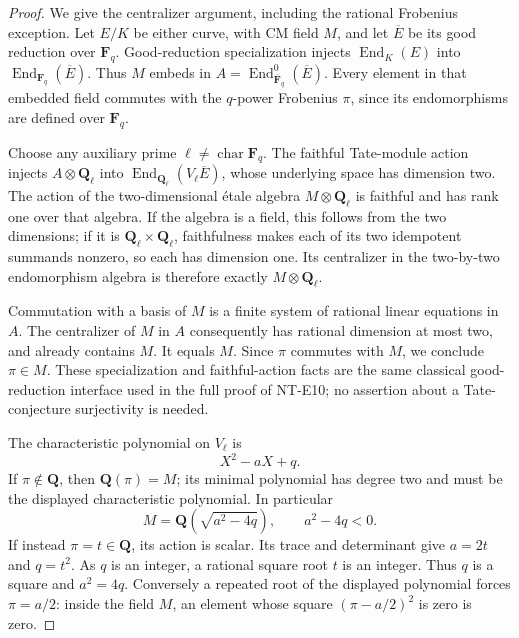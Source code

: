 \begin{proof}
We give the centralizer argument, including the rational
Frobenius exception. Let \(E/K\) be either curve, with
CM field \(M\), and let \(\overline E\) be its good
reduction over \(\mathbf F_q\). Good-reduction
specialization injects \(\operatorname{End}_K(E)\) into
\(\operatorname{End}_{\mathbf F_q}(\overline E)\).
Thus \(M\) embeds in
\(A=\operatorname{End}_{\overline{\mathbf F}_q}^0(\overline E)\).
Every element in that embedded field commutes with the
\(q\)-power Frobenius \(\pi\), since its endomorphisms
are defined over \(\mathbf F_q\).

Choose any auxiliary prime \(\ell\ne\operatorname{char}\mathbf F_q\).
The faithful Tate-module action injects
\(A\otimes\mathbf Q_\ell\) into
\(\operatorname{End}_{\mathbf Q_\ell}(V_\ell\overline E)\),
whose underlying space has dimension two.
The action of the two-dimensional \'{e}tale algebra
\(M\otimes\mathbf Q_\ell\) is faithful and has rank one
over that algebra. If the algebra is a field, this
follows from the two dimensions; if it is
\(\mathbf Q_\ell\times\mathbf Q_\ell\), faithfulness
makes each of its two idempotent summands nonzero,
so each has dimension one.
Its centralizer in the two-by-two endomorphism algebra
is therefore exactly \(M\otimes\mathbf Q_\ell\).

Commutation with a basis of \(M\) is a finite system of
rational linear equations in \(A\). The centralizer of
\(M\) in \(A\) consequently has rational dimension at
most two, and already contains \(M\). It equals \(M\).
Since \(\pi\) commutes with \(M\), we conclude \(\pi\in M\).
These specialization and faithful-action facts are
the same classical good-reduction interface used in
the full proof of NT-E10; no assertion about a
Tate-conjecture surjectivity is needed.

The characteristic polynomial on \(V_\ell\) is
\[
                       X^2-aX+q .
 \]
If \(\pi\notin\mathbf Q\), then \(\mathbf Q(\pi)=M\);
its minimal polynomial has degree two and must be the
displayed characteristic polynomial. In particular
\[
                 M=\mathbf Q(\sqrt{a^2-4q}),
                         \qquad a^2-4q<0.               \tag{E12.4}
 \]
If instead \(\pi=t\in\mathbf Q\), its action is scalar.
Its trace and determinant give \(a=2t\) and \(q=t^2\).
As \(q\) is an integer, a rational square root \(t\)
is an integer. Thus \(q\) is a square and \(a^2=4q\).
Conversely a repeated root of the displayed polynomial
forces \(\pi=a/2\): inside the field \(M\), an element
whose square \((\pi-a/2)^2\) is zero is zero.


\end{proof}
